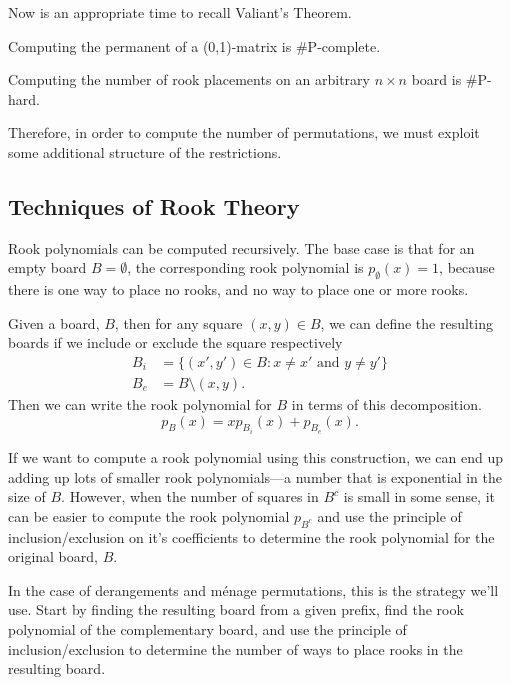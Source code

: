 Now is an appropriate time to recall Valiant's Theorem.

\begin{theorem}
  Computing the permanent of a (0,1)-matrix is \#P-complete.
\end{theorem}

\begin{corollary}
  Computing the number of rook placements on an arbitrary $n \times n$ board is
  \#P-hard.
\end{corollary}

Therefore, in order to compute the number of permutations, we must exploit some
additional structure of the restrictions.

\subsection{Techniques of Rook Theory}
Rook polynomials can be computed recursively. The base case is that
for an empty board $B = \emptyset$, the corresponding rook polynomial is
$p_\emptyset(x) = 1$, because there is one way to place no rooks, and no way
to place one or more rooks.
\begin{lemma}
  Given a board, $B$, then for any square $(x,y) \in B$, we can define
  the resulting boards if we include or exclude the square respectively
  \begin{align}
    B_i &= \{(x',y') \in B : x \neq x' \text{ and } y \neq y'\} \\
    B_e &= B \setminus {(x,y)}.
  \end{align}
  Then we can write the rook polynomial for $B$ in terms of this decomposition.
  \[
    p_B(x) = xp_{B_i}(x) + p_{B_e}(x).
  \]
  \label{lemma:rookPolynomialRecursion}
\end{lemma}

If we want to compute a rook polynomial using this construction, we can end
up adding up lots of smaller rook polynomials---a number that is exponential in
the size of $B$.
However, when the number of squares in $B^c$ is small in some sense, it can be
easier to compute the rook polynomial $p_{B^c}$ and use the principle of
inclusion/exclusion on it's coefficients to determine the rook polynomial for
the original board, $B$.

In the case of derangements and m\'enage permutations, this is the strategy
we'll use.
Start by finding the resulting board from a given prefix,
find the rook polynomial of the complementary board, and
use the principle of inclusion/exclusion to determine the number of ways to
place rooks in the resulting board.

